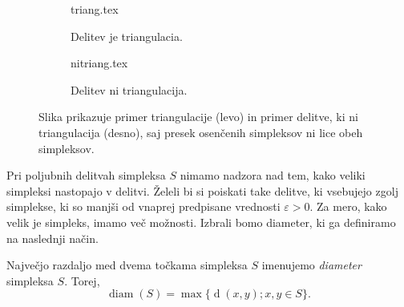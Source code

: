 \documentclass[mat1]{fmfdelo}
\DeclareMathOperator{\diam}{diam}
\DeclareMathOperator{\dist}{d}
\newcommand{\0}{0}
\begin{document}
\begin{figure}[h]  
\centering 
	\begin{subfigure}[b]{0.4\linewidth} 
	\centering
		{triang.tex}%
		\caption{Delitev je triangulacia.} \label{fig:triang}
	\end{subfigure}
	\hspace{1cm}
	\begin{subfigure}[b]{0.4\linewidth}
	\centering
		{nitriang.tex}%
		\caption{Delitev ni triangulacija.} \label{fig:nitriang}  
	\end{subfigure}
\caption{Slika prikazuje primer triangulacije (levo) in primer delitve, ki ni triangulacija (desno), saj presek osenčenih simpleksov ni lice obeh simpleksov.}
\end{figure} 
Pri poljubnih delitvah simpleksa $S$ nimamo nadzora nad tem, kako veliki simpleksi nastopajo v delitvi. Želeli bi si poiskati take delitve, ki vsebujejo zgolj simplekse, ki so manjši od vnaprej predpisane vrednosti $\varepsilon > 0$.
Za mero, kako velik je simpleks, imamo več možnosti. Izbrali bomo diameter, ki ga definiramo na naslednji način.
\begin{definicija}
Največjo razdaljo med dvema točkama simpleksa $S$ imenujemo \emph{diameter} simpleksa $S$. Torej,
$$\diam(S) = \max \{ \dist(x, y); x, y \in S\}.$$
\end{definicija}
\end{document}
